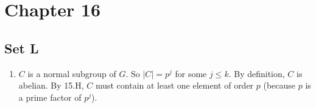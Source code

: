 \section{Chapter 16}
\subsection{Set L}
\begin{enumerate}
    \item $C$ is a normal subgroup of $G$. So $|C| = p^j$ for some $j \leqslant k$. By definition, $C$ is abelian. By 15.H, $C$ must contain at least one element of order $p$ (because $p$ is a prime factor of $p^j$).
\end{enumerate}